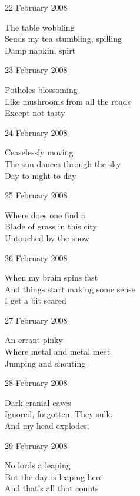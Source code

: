 \documentclass[12pt]{article}
\begin{document}
22 February 2008

The table wobbling \\
Sends my tea stumbling, spilling \\
Damp napkin, spirt 

\newpage

23 February 2008

Potholes blossoming \\
Like mushrooms from all the roads \\
Except not tasty

24 February 2008

Ceaselessly moving \\
The sun dances through the sky \\
Day to night to day

25 February 2008

Where does one find a \\
Blade of grass in this city \\
Untouched by the snow

26 February 2008

When my brain spins fast \\
And things start making some sense \\
I get a bit scared

27 February 2008

An errant pinky \\
Where metal and metal meet \\
Jumping and shouting

28 February 2008

Dark cranial caves \\
Ignored, forgotten. They sulk. \\
And my head explodes.

29 February 2008

No lords a leaping \\
But the day is leaping here \\
And that's all that counts

\newpage
\end{document}
